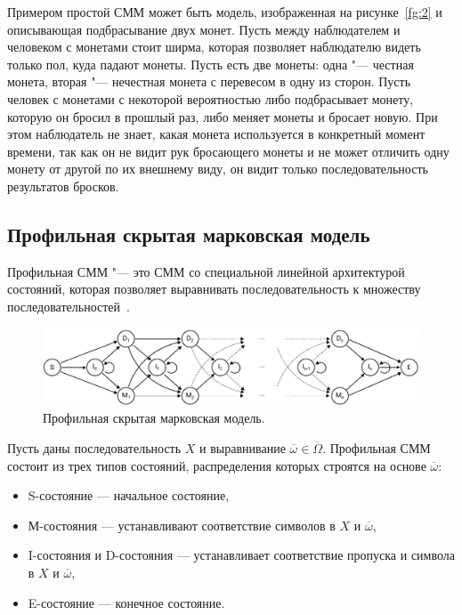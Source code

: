 \documentclass[specialist,
substylefile = spbu_report.rtx,
subf,href,colorlinks=true, 12pt]{disser}
\begin{document}
				Примером простой СММ может быть модель, изображенная на рисунке~\ref{fg:2} и описывающая подбрасывание двух монет. Пусть между наблюдателем и человеком с монетами стоит ширма, которая позволяет наблюдателю видеть только пол, куда падают монеты. Пусть есть две монеты: одна "--- честная монета, вторая "--- нечестная монета с перевесом в одну из сторон. Пусть человек с монетами с некоторой вероятностью либо подбрасывает монету, которую он бросил в прошлый раз, либо меняет монеты и бросает новую. При этом наблюдатель не знает, какая монета используется в конкретный момент времени, так как он не видит рук бросающего монеты и не может отличить одну монету от другой по их внешнему виду, он видит только последовательность результатов бросков.
				
			\subsection{Профильная скрытая марковская модель}
				Профильная СММ "--- это СММ со специальной линейной архитектурой состояний, которая позволяет выравнивать последовательность к множеству последовательностей~\cite{Compeau2015a}.
				
				\begin{figure}[h]
					\centering
					\includegraphics[width=15cm]{figure2}
					\caption{Профильная скрытая марковская модель.}  
					\label{fg:3}
				\end{figure}
				
				Пусть даны последовательность $X$ и выравнивание $\overline{\omega} \in \overline{\Omega}$.	Профильная СММ состоит из трех типов состояний, распределения которых строятся на основе $\overline{\omega}$:
				\begin{itemize}
					\item S-состояние --- начальное состояние,
					\item М-состояния --- устанавливают соответствие символов в $X$ и $\overline{\omega}$,
					\item I-состояния и D-состояния --- устанавливает соответствие пропуска и символа в $X$ и $\overline{\omega}$,
					\item E-состояние --- конечное состояние.
				\end{itemize}
			
\end{document}

